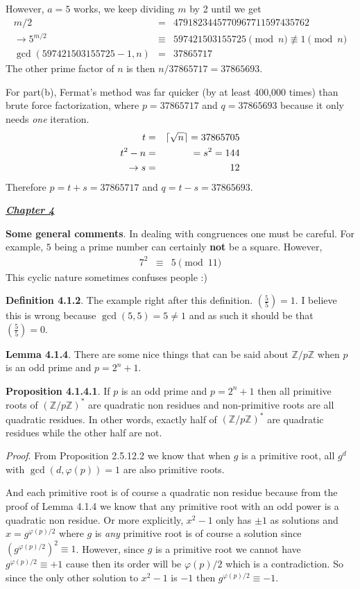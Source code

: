 \documentclass[aps,preprint,preprintnumbers,nofootinbib,showpacs,prd]{revtex4-1}
\newcommand{\nbea}{\begin{eqnarray*}}
\newcommand{\neea}{\end{eqnarray*}}
\DeclarePairedDelimiter{\ceil}{\lceil}{\rceil}
\begin{document}
However, $a=5$ works, we keep dividing $m$ by 2 until we get
%
\nbea
m/2 & = & 4791823445770967711597435762 \\
\to 5^{m/2} & \equiv & 597421503155725 \pmod{n} \not\equiv 1 \pmod{n} \\
\gcd(597421503155725 - 1, n) & = & 37865717
\neea
%
The other prime factor of $n$ is then $n / 37865717 = 37865693$.

For part(b), Fermat's method was far quicker (by at least 400,000 times) than brute force factorization, where $p = 37865717$ and $q = 37865693$ because it only needs {\it one} iteration.
%
\nbea
t & = & \ceil{\sqrt{n}} = 37865705 \\
t^2 - n & = & = s^2 = 144 \\
\to s & = & 12
\neea
%
Therefore $p = t + s = 37865717$ and $q = t - s = 37865693$.

\bigskip
\underline{\textbf{\textit{Chapter 4}}}
\bigskip

{\bf Some general comments}. In dealing with congruences one must be careful. For example, $5$ being a prime number can certainly {\bf not} be a square. However,
%
\nbea
7^2 & \equiv & 5 \pmod{11}
\neea
%
This cyclic nature sometimes confuses people :)

{\bf Definition 4.1.2}. The example right after this definition. $\left ( \frac{5}{5}\right ) = 1$. I believe this is wrong because $\gcd(5,5) = 5 \neq 1$ and as such it should be that $\left ( \frac{5}{5}\right ) = 0$.

{\bf Lemma 4.1.4}. There are some nice things that can be said about $\mathbb{Z}/p\mathbb{Z}$  when $p$ is an odd prime and $p = 2^n + 1$.

{\bf Proposition 4.1.4.1}. If $p$ is an odd prime and $p = 2^n + 1$ then all primitive roots of $(\mathbb{Z}/p\mathbb{Z})^*$ are quadratic non residues and non-primitive roots are all quadratic residues. In other words, exactly half of $(\mathbb{Z}/p\mathbb{Z})^*$ are quadratic residues while the other half are not.

{\it Proof}. From Proposition 2.5.12.2 we know that when $g$ is a primitive root, all $g^d$ with $\gcd(d, \varphi(p)) = 1$ are also primitive roots.

And each primitive root is of course a quadratic non residue because from the proof of Lemma 4.1.4 we know that any primitive root with an odd power is a quadratic non residue. Or more explicitly, $x^2 - 1$ only has $\pm1$ as solutions and $x=g^{\varphi(p)/2}$ where $g$ is {\it any} primitive root is of course a solution since $(g^{\varphi(p)/2})^2 \equiv 1$. However, since $g$ is a primitive root we cannot have $g^{\varphi(p)/2} \equiv +1$ cause then its order will be $\varphi(p)/2$ which is a contradiction. So since the only other solution to $x^2-1$ is $-1$ then $g^{\varphi(p)/2} \equiv -1$.
\end{document}
